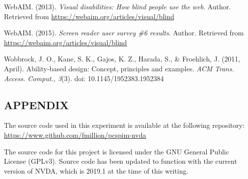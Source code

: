 \documentclass[11.5pt]{sig-alternate} %
\begin{document}
WebAIM. (2013). \textit{Visual disabilities: How blind people use the web}. Author. Retrieved from \url{https://webaim.org/articles/visual/blind}

WebAIM. (2015). \textit{Screen reader user survey \#6 results}. Author. Retrieved from \url{https://webaim.org/articles/visual/blind}

Wobbrock, J. O., Kane, S. K., Gajos, K. Z., Harada, S., \& Froehlich, J. (2011, April). Ability-based design: Concept, principles and examples. \textit{ACM Trans. Access. Comput., 3}(3). doi: 10.1145/1952383.1952384

\clearpage
\begin{large}

\leftskip 0in
\parindent 0in 

\section*{APPENDIX} 
The source code used in this experiment is available at the following repository: \url{https://www.github.com/fmillion/pcspim-nvda}

The source code for this project is licensed under the GNU General Public License (GPLv3). Source code has been updated to function with the current version of NVDA, which is 2019.1 at the time of this writing. 

\end{large}
\end{document}
